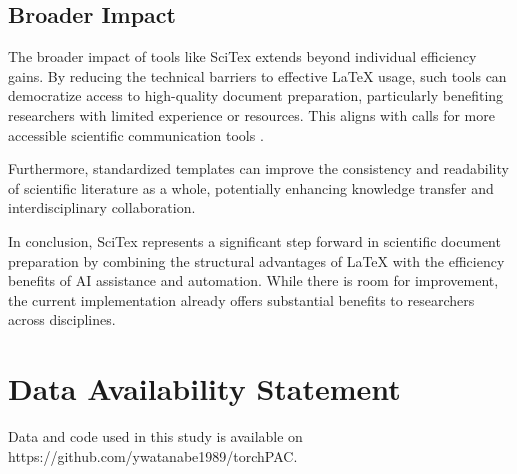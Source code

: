 \documentclass[preprint,review,12pt]{elsarticle}\n
\begin{document}
\subsection{Broader Impact}
\label{subsec:impact}

The broader impact of tools like SciTex extends beyond individual efficiency gains. By reducing the technical barriers to effective LaTeX usage, such tools can democratize access to high-quality document preparation, particularly benefiting researchers with limited experience or resources. This aligns with calls for more accessible scientific communication tools \cite{Patel2022}.

Furthermore, standardized templates can improve the consistency and readability of scientific literature as a whole, potentially enhancing knowledge transfer and interdisciplinary collaboration.

In conclusion, SciTex represents a significant step forward in scientific document preparation by combining the structural advantages of LaTeX with the efficiency benefits of AI assistance and automation. While there is room for improvement, the current implementation already offers substantial benefits to researchers across disciplines.



\section*{Data Availability Statement}
Data and code used in this study is available on https://github.com/ywatanabe1989/torchPAC.
\label{data and code availability}







% 
\end{document}

